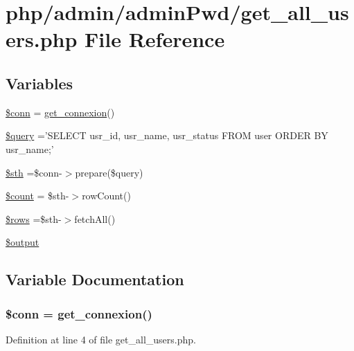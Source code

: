 \hypertarget{get__all__users_8php}{\section{php/admin/admin\-Pwd/get\-\_\-all\-\_\-users.php File Reference}
\label{get__all__users_8php}
}
\subsection*{Variables}
\begin{DoxyCompactItemize}
\item 
\hyperlink{get__all__users_8php_aa8a5a87b9c1a6a0819b88447cbe41877}{\$conn} = \hyperlink{php__functions_8php_ace18bc10f3fd08f92688ac743e0d8c2e}{get\-\_\-connexion}()
\item 
\hyperlink{get__all__users_8php_af59a5f7cd609e592c41dc3643efd3c98}{\$query} ='S\-E\-L\-E\-C\-T usr\-\_\-id, usr\-\_\-name, usr\-\_\-status F\-R\-O\-M user O\-R\-D\-E\-R B\-Y usr\-\_\-name;'
\item 
\hyperlink{get__all__users_8php_afa9126f9664959c02795be300a135f93}{\$sth} =\$conn-\/$>$prepare(\$query)
\item 
\hyperlink{get__all__users_8php_af789423037bbc89dc7c850e761177570}{\$count} = \$sth-\/$>$row\-Count()
\item 
\hyperlink{get__all__users_8php_ace2ec39e7df3899fa8df9640ec274b03}{\$rows} =\$sth-\/$>$fetch\-All()
\item 
\hyperlink{get__all__users_8php_a73004ce9cd673c1bfafd1dc351134797}{\$output}
\end{DoxyCompactItemize}


\subsection{Variable Documentation}
\hypertarget{get__all__users_8php_aa8a5a87b9c1a6a0819b88447cbe41877}{
\subsubsection[{\$conn}]{\setlength{\rightskip}{0pt plus 5cm}\$conn = {\bf get\-\_\-connexion}()}}\label{get__all__users_8php_aa8a5a87b9c1a6a0819b88447cbe41877}


Definition at line 4 of file get\-\_\-all\-\_\-users.\-php.

